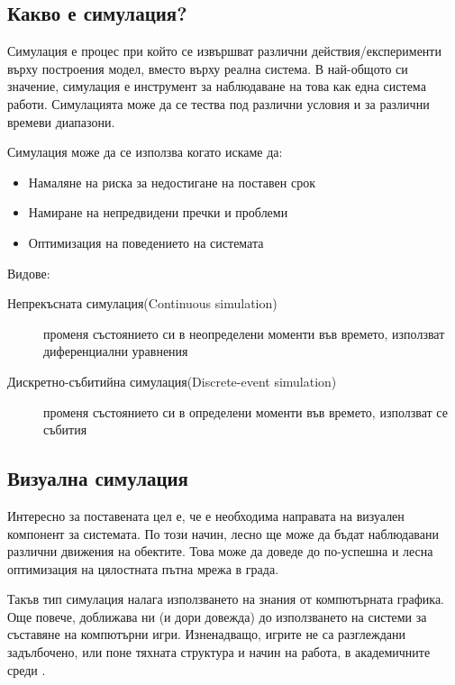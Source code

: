 	\subsection{Какво е симулация?}
	
		Симулация е процес при който се извършват различни действия/експерименти върху построения модел, 
		вместо върху реална система. В най-общото си значение, симулация е инструмент за наблюдаване на това
		как една система работи. Симулацията може да се тества под различни условия и за различни времеви диапазони.
		
		Симулация може да се използва когато искаме да:
		
		\begin{itemize}
			\item Намаляне на риска за недостигане на поставен срок		
 			\item Намиране на непредвидени пречки и проблеми
 			\item Оптимизация на поведението на системата
		\end{itemize}
		
		Видове:
		
		\begin{description}
			\item[Непрекъсната симулация(Continuous simulation)] променя състоянието си в неопределени моменти във времето,
			 използват диференциални уравнения
			\item[Дискретно-събитийна симулация(Discrete-event simulation)] променя състоянието си в определени моменти във
			 времето, използват се събития
		\end{description}
		
	\subsection{Визуална симулация}
	
		Интересно за поставената цел е, че е необходима направата на визуален компонент за системата.
		По този начин, лесно ще може да бъдат наблюдавани различни движения на обектите. Това може да 
		доведе до по-успешна и лесна оптимизация на цялостната пътна мрежа в града.
		
		Такъв тип симулация налага използването на знания от компютърната графика. 
		Още повече, доближава ни (и дори довежда) до използването на системи за съставяне на компютърни игри. 
		Изненадващо, игрите не са разглеждани задълбочено, или поне тяхната структура и начин на работа, 
		в академичните среди \cite{Holzkorn}.
		
